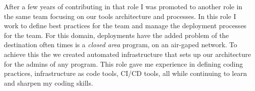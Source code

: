 




After a few years of contributing in that role I was promoted to another role in the same team focusing on our tools architecture and processes.
In this role I work to define best practices for the team and manage the deployment processes for the team.
For this domain, deployments have the added problem of the destination often times is a \textit{closed area} program, on an air-gaped network. To achieve this the we created automated infrastructure that sets up our architecture for the admins of any program.
This role gave me experience in defining coding practices, infrastructure as code tools, CI/CD tools, all while continuing to learn and sharpen my coding skills.